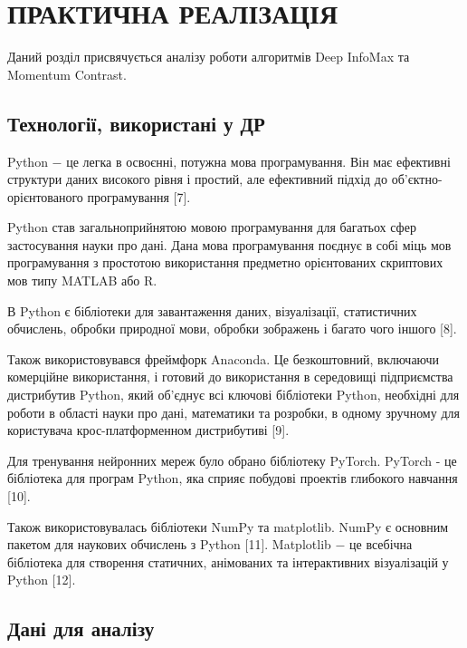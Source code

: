 \section{ПРАКТИЧНА РЕАЛІЗАЦІЯ}

Даний розділ присвячується аналізу роботи алгоритмів Deep InfoMax та Momentum Contrast.

\subsection{Технології, використані у ДР}

Python $-$ це легка в освоєнні, потужна мова програмування. Він має ефективні структури даних високого рівня і простий, але ефективний підхід до об'єктно-орієнтованого програмування [7].

Python став загальноприйнятою мовою програмування для багатьох сфер застосування науки про дані. Дана мова програмування поєднує в собі міць мов програмування з простотою використання предметно орієнтованих скриптових мов типу MATLAB або R. 

В Python є бібліотеки для завантаження даних, візуалізації, статистичних обчислень, обробки природної мови, обробки зображень і багато чого іншого [8].

Також використовувався фреймфорк Anaconda. Це безкоштовний, включаючи комерційне використання, і готовий до використання в середовищі підприємства дистрибутив Python, який об'єднує всі ключові бібліотеки Python, необхідні для роботи в області науки про дані, математики та розробки, в одному зручному для користувача крос-платформенном дистрибутиві [9].

Для тренування нейронних мереж було обрано бібліотеку PyTorch. PyTorch - це бібліотека для програм Python, яка сприяє побудові проектів глибокого навчання [10].

Також використовувалась бібліотеки NumPy та matplotlib. NumPy є основним пакетом для наукових обчислень з Python [11]. Matplotlib $-$ це всебічна бібліотека для створення статичних, анімованих та інтерактивних візуалізацій у Python [12]. 

\vspace{1em}

\subsection{Дані для аналізу}


